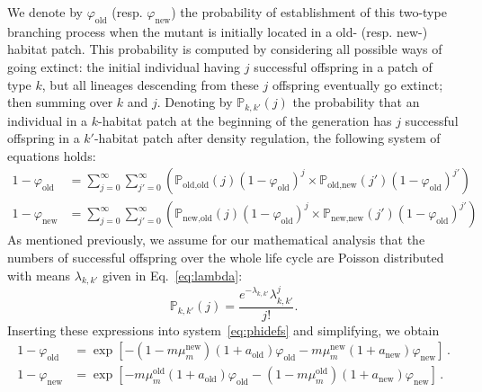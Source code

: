 \documentclass[11pt]{article}
\begin{document}
We denote by $\varphi_{\text{old}}$ (resp. $\varphi_{\text{new}}$) the probability of establishment of this two-type branching process when the mutant is initially located in a old- (resp. new-) habitat patch. This probability is computed by considering all possible ways of going extinct: the initial individual having $j$ successful offspring in a patch of type $k$, but all lineages descending from these $j$ offspring eventually go extinct; then summing over $k$ and $j$. Denoting by $\mathbb{P}_{k, k'}(j)$ the probability that an individual in a $k$-habitat patch at the beginning of the generation has $j$ successful offspring in a $k'$-habitat patch after density regulation, the following system of equations holds:
\begin{subequations}\label{eq:phidefs}
\begin{align}
1 - \varphi_{\text{old}} &= \sum_{j=0}^{\infty}\sum_{j'=0}^{\infty} \left( \mathbb{P}_{\text{old}, \text{old}}(j) (1-\varphi_{\text{old}})^j \times \mathbb{P}_{\text{old}, \text{new}}(j')  (1-\varphi_{\text{old}})^{j'} \right) \\
%
1 - \varphi_{\text{new}} &= \sum_{j=0}^{\infty}\sum_{j'=0}^{\infty} \left( \mathbb{P}_{\text{new}, \text{old}}(j) (1-\varphi_{\text{old}})^j \times \mathbb{P}_{\text{new}, \text{new}}(j')  (1-\varphi_{\text{old}})^{j'} \right)
\end{align}
\end{subequations}
%
As mentioned previously, we assume for our mathematical analysis that the numbers of successful offspring over the whole life cycle are Poisson distributed with means $\lambda_{k,k'}$ given in Eq.~\eqref{eq:lambda}: 
%
\begin{equation}\label{eq:poissondist}
\mathbb{P}_{k, k'}(j) = \frac{e^{- \lambda_{k,k'}} \lambda_{k,k'}^j}{j!}.
\end{equation}
%
Inserting these expressions into system~\eqref{eq:phidefs} and simplifying, we obtain
%
\begin{subequations}\label{eq:ext_prob}
	\begin{align}
	1-\varphi_{\text{old}}  &=\exp\left[-\left(1 - m \mu_{m}^{\text{new}} \right)(1+a_{\text{old}})\varphi_{\text{old}} - m \mu_{m}^{\text{new}} (1+a_{\text{new}}) \varphi_{\text{new}}\right]\, .   \\
	1-\varphi_{\text{new}} &= \exp\left[- m \mu_{m}^{\text{old}} (1+a_{\text{old}})\varphi_{\text{old}} - \left(1- m \mu_{m}^{\text{old}} \right) (1+a_{\text{new}}) \varphi_{\text{new}}\right]\, .
\end{align}
\end{subequations}
\end{document}
